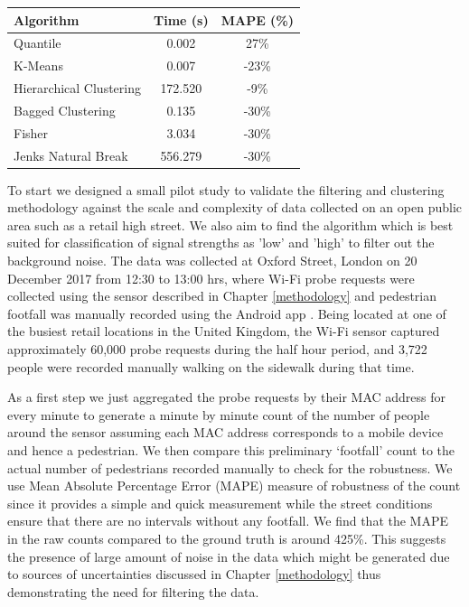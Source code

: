 \begin{table}
{\begin{tabular}{lcc} 
\toprule
	 Algorithm					& Time (s) 	& MAPE (\%) \\
\midrule
	 Quantile					& 0.002 	&  27\% \\
	 K-Means			 		& 0.007 	& -23\% \\
	 Hierarchical Clustering	& 172.520 	& -9\% \\
	 Bagged Clustering 			& 0.135 	& -30\% \\
	 Fisher 					& 3.034 	& -30\% \\
	 Jenks Natural Break 		& 556.279 	& -30\% \\
 \bottomrule
\end{tabular}}
\label{classification-table}
\end{table}

To start we designed a small pilot study to validate the filtering and
clustering methodology against the scale and complexity of data collected on an
open public area such as a retail high street.  We also aim to find the
algorithm which is best suited for classification of signal strengths as 'low'
and 'high' to filter out the background noise.  The data was collected at Oxford
Street, London on 20 December 2017 from 12:30 to 13:00 hrs, where Wi-Fi probe
requests were collected using the sensor described in Chapter \ref{methodology}
and pedestrian footfall was manually recorded using the Android app
\citep{bala2018clicker}.  Being located at one of the busiest retail locations
in the United Kingdom, the Wi-Fi sensor captured approximately 60,000 probe
requests during the half hour period, and 3,722 people were recorded manually
walking on the sidewalk during that time.

As a first step we just aggregated the probe requests by their MAC address for
every minute to generate a minute by minute count of the number of people around
the sensor assuming each MAC address corresponds to a mobile device and hence a
pedestrian.  We then compare this preliminary `footfall' count to the actual
number of pedestrians recorded manually to check for the robustness. We use Mean
Absolute Percentage Error (MAPE) measure of robustness of the count since it
provides a simple and quick measurement while the street conditions ensure that
there are no intervals without any footfall.  We find that the MAPE in the raw
counts compared to the ground truth is around 425\%.  This suggests the presence
of large amount of noise in the data which might be generated due to sources of
uncertainties discussed in Chapter \ref{methodology} thus demonstrating the need
for filtering the data.

